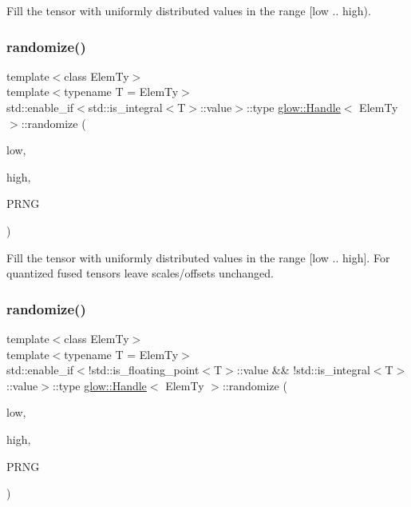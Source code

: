 Fill the tensor with uniformly distributed values in the range \mbox{[}low .. high). \mbox{\label{classglow_1_1_handle_a7b66d372800e15c009ee8d4aae8d32c2}} 
\subsubsection{\texorpdfstring{randomize()}{randomize()}\hspace{0.1cm}{\footnotesize\ttfamily [2/3]}}
{\footnotesize\ttfamily template$<$class Elem\+Ty$>$ \\
template$<$typename T  = Elem\+Ty$>$ \\
std\+::enable\+\_\+if$<$std\+::is\+\_\+integral$<$T$>$\+::value$>$\+::type \hyperlink{classglow_1_1_handle}{glow\+::\+Handle}$<$ Elem\+Ty $>$\+::randomize (\begin{DoxyParamCaption}\item[{int}]{low,  }\item[{int}]{high,  }\item[{\hyperlink{classglow_1_1_pseudo_r_n_g}{Pseudo\+R\+NG} \&}]{P\+R\+NG }\end{DoxyParamCaption})\hspace{0.3cm}{\ttfamily [inline]}}

Fill the tensor with uniformly distributed values in the range \mbox{[}low .. high\mbox{]}. For quantized fused tensors leave scales/offsets unchanged. \mbox{\label{classglow_1_1_handle_afc9f5d40382d7db26e117c2e7b3636a3}} 
\subsubsection{\texorpdfstring{randomize()}{randomize()}\hspace{0.1cm}{\footnotesize\ttfamily [3/3]}}
{\footnotesize\ttfamily template$<$class Elem\+Ty$>$ \\
template$<$typename T  = Elem\+Ty$>$ \\
std\+::enable\+\_\+if$<$!std\+::is\+\_\+floating\+\_\+point$<$T$>$\+::value \&\& !std\+::is\+\_\+integral$<$T$>$\+::value$>$\+::type \hyperlink{classglow_1_1_handle}{glow\+::\+Handle}$<$ Elem\+Ty $>$\+::randomize (\begin{DoxyParamCaption}\item[{float}]{low,  }\item[{float}]{high,  }\item[{\hyperlink{classglow_1_1_pseudo_r_n_g}{Pseudo\+R\+NG} \&}]{P\+R\+NG }\end{DoxyParamCaption})\hspace{0.3cm}{\ttfamily [inline]}}

